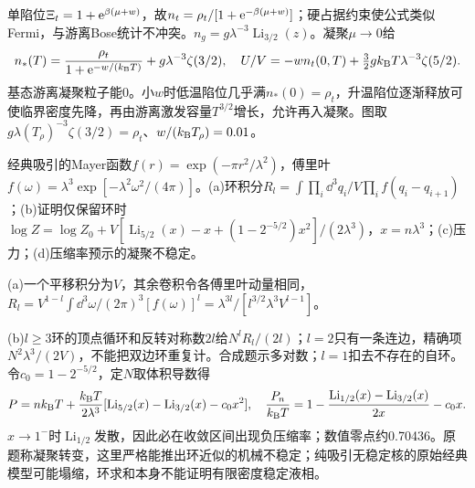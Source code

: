 \begin{solution}
单陷位$\Xi_t=1+\mathrm e^{\beta(\mu+w)}$，故$n_t=\rho_t/[1+\mathrm e^{-\beta(\mu+w)}]$；硬占据约束使公式类似Fermi，与游离Bose统计不冲突。$n_g=g\lambda^{-3}\operatorname{Li}_{3/2}(z)$。凝聚$\mu\to0$给
\begin{equation}
n_*(T)=\frac{\rho_t}{1+\mathrm e^{-w/(k_{\mathrm B} T)}}+g\lambda^{-3}\zeta(3/2),\quad
U/V=-wn_t(0,T)+\tfrac32gk_{\mathrm B} T\lambda^{-3}\zeta(5/2).
\end{equation}
基态游离凝聚粒子能0。小$w$时低温陷位几乎满$n_*(0)=\rho_t$，升温陷位逐渐释放可使临界密度先降，再由游离激发容量$T^{3/2}$增长，允许再入凝聚。图取$g\lambda(T_\rho)^{-3}\zeta(3/2)=\rho_t$、$w/(k_{\mathrm B} T_\rho)=0.01$。
\begin{center}\end{center}
\end{solution}
\begin{exercise}[原题10(a)--(d)，选做]\label{p:333-6-10}
经典吸引的Mayer函数$f(r)=\exp(-\pi r^2/\lambda^2)$，傅里叶$f(\omega)=\lambda^3\exp[-\lambda^2\omega^2/(4\pi)]$。(a)环积分$R_l=\int\prod_i\dd^3q_i/V\prod_if(q_i-q_{i+1})$；(b)证明仅保留环时$\log Z=\log Z_0+V[\operatorname{Li}_{5/2}(x)-x+(1-2^{-5/2})x^2]/(2\lambda^3)$，$x=n\lambda^3$；(c)压力；(d)压缩率预示的凝聚不稳定。
\end{exercise}
\begin{solution}
(a)一个平移积分为$V$，其余卷积令各傅里叶动量相同，$R_l=V^{1-l}\int\dd^3\omega/(2\pi)^3[f(\omega)]^l=\lambda^{3l}/[l^{3/2}\lambda^3V^{l-1}]$。

(b)$l\ge3$环的顶点循环和反转对称数$2l$给$N^lR_l/(2l)$；$l=2$只有一条连边，精确项$N^2\lambda^3/(2V)$，不能把双边环重复计。合成题示多对数；$l=1$扣去不存在的自环。令$c_0=1-2^{-5/2}$，定$N$取体积导数得
\begin{equation}
P=nk_{\mathrm B} T+\frac{k_{\mathrm B} T}{2\lambda^3}[\operatorname{Li}_{5/2}(x)-\operatorname{Li}_{3/2}(x)-c_0x^2],\quad
\frac{P_n}{k_{\mathrm B} T}=1-\frac{\operatorname{Li}_{1/2}(x)-\operatorname{Li}_{3/2}(x)}{2x}-c_0x.
\end{equation}
$x\to1^-$时$\operatorname{Li}_{1/2}$发散，因此必在收敛区间出现负压缩率；数值零点约0.70436。原题称凝聚转变，这里严格能推出环近似的机械不稳定；纯吸引无稳定核的原始经典模型可能塌缩，环求和本身不能证明有限密度稳定液相。
\end{solution}
